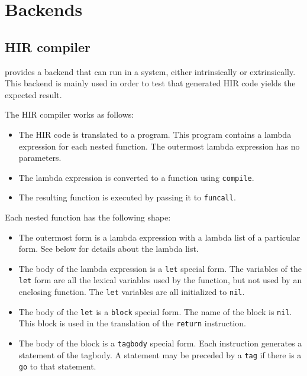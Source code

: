\chapter{Backends}

\section{HIR compiler}

\sysname{} provides a backend that can run in a \commonlisp{} system,
either intrinsically or extrinsically.  This backend is mainly used
in order to test that generated HIR code yields the expected result.

The HIR compiler works as follows:

\begin{itemize}
\item The HIR code is translated to a \commonlisp{} program.  This
  program contains a lambda expression for each nested function.  The
  outermost lambda expression has no parameters.
\item The lambda expression is converted to a function using
  \texttt{compile}.
\item The resulting function is executed by passing it to
  \texttt{funcall}.
\end{itemize}

Each nested function has the following shape:

\begin{itemize}
\item The outermost form is a lambda expression with a lambda list of
  a particular form.  See below for details about the lambda list.
\item The body of the lambda expression is a \texttt{let} special
  form.  The variables of the \texttt{let} form are all the lexical
  variables used by the function, but not used by an enclosing
  function.  The \texttt{let} variables are all initialized to
  \texttt{nil}.
\item The body of the \texttt{let} is a \texttt{block} special form.
  The name of the block is \texttt{nil}.  This block is used in the
  translation of the \texttt{return} instruction.
\item The body of the block is a \texttt{tagbody} special form.  Each
  instruction generates a statement of the tagbody.  A statement may
  be preceded by a \texttt{tag} if there is a \texttt{go} to that
  statement.
\end{itemize}

